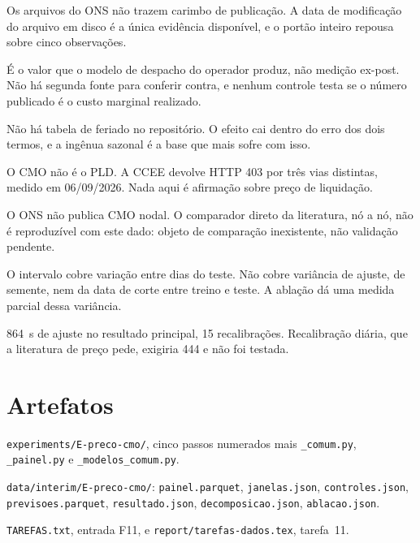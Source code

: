 \documentclass[10pt,a4paper,oneside,twocolumn]{book}
\begin{document}
 Os arquivos do ONS não trazem carimbo de
publicação. A data de modificação do arquivo em disco é a única evidência
disponível, e o portão inteiro repousa sobre cinco observações.

 É o valor que o modelo de despacho do operador
produz, não medição ex-post. Não há segunda fonte para conferir contra, e
nenhum controle testa se o número publicado é o custo marginal realizado.

 Não há tabela de feriado no repositório. O efeito cai
dentro do erro dos dois termos, e a ingênua sazonal é a base que mais sofre com
isso.

 O CMO não é o PLD. A CCEE devolve HTTP 403 por
três vias distintas, medido em 06/09/2026. Nada aqui é afirmação sobre preço de
liquidação.

 O ONS não publica CMO nodal. O comparador direto da
literatura, nó a nó, não é reproduzível com este dado: objeto de comparação
inexistente, não validação pendente.

 O intervalo cobre variação entre dias do
teste. Não cobre variância de ajuste, de semente, nem da data de corte entre
treino e teste. A ablação dá uma medida parcial dessa variância.

 \num{864}~s de ajuste no resultado principal, 15 recalibrações.
Recalibração diária, que a literatura de preço pede, exigiria 444 e não foi
testada.


\section*{Artefatos}

\begin{ficha}
  \item[Código] \raggedright \texttt{experiments/E-preco-cmo/}, cinco passos
                numerados mais \texttt{\_comum.py}, \texttt{\_painel.py} e
                \texttt{\_modelos\_comum.py}.
  \item[Saídas] \raggedright \texttt{data/interim/E-preco-cmo/}:
                \texttt{painel.parquet}, \texttt{janelas.json},
                \texttt{controles.json}, \texttt{previsoes.parquet},
                \texttt{resultado.json}, \texttt{decomposicao.json},
                \texttt{ablacao.json}.
  \item[Registro] \raggedright \texttt{TAREFAS.txt}, entrada F11, e
                  \texttt{report/tarefas-dados.tex}, tarefa~11.
\end{ficha}
\end{document}
